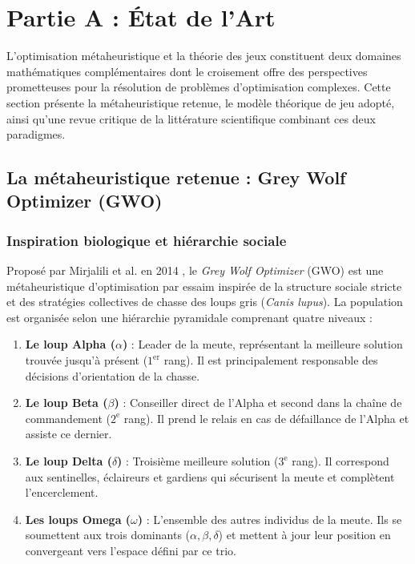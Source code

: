 \section{Partie A : État de l'Art}

L'optimisation métaheuristique et la théorie des jeux constituent deux domaines mathématiques complémentaires dont le croisement offre des perspectives prometteuses pour la résolution de problèmes d'optimisation complexes. Cette section présente la métaheuristique retenue, le modèle théorique de jeu adopté, ainsi qu'une revue critique de la littérature scientifique combinant ces deux paradigmes.

\subsection{La métaheuristique retenue : Grey Wolf Optimizer (GWO)}

\subsubsection{Inspiration biologique et hiérarchie sociale}
Proposé par Mirjalili et al. en 2014 \cite{mirjalili2014grey}, le \textit{Grey Wolf Optimizer} (GWO) est une métaheuristique d'optimisation par essaim inspirée de la structure sociale stricte et des stratégies collectives de chasse des loups gris (\textit{Canis lupus}). La population est organisée selon une hiérarchie pyramidale comprenant quatre niveaux :
\begin{enumerate}
    \item \textbf{Le loup Alpha ($\alpha$)} : Leader de la meute, représentant la meilleure solution trouvée jusqu'à présent ($1^{\text{er}}$ rang). Il est principalement responsable des décisions d'orientation de la chasse.
    \item \textbf{Le loup Beta ($\beta$)} : Conseiller direct de l'Alpha et second dans la chaîne de commandement ($2^{\text{e}}$ rang). Il prend le relais en cas de défaillance de l'Alpha et assiste ce dernier.
    \item \textbf{Le loup Delta ($\delta$)} : Troisième meilleure solution ($3^{\text{e}}$ rang). Il correspond aux sentinelles, éclaireurs et gardiens qui sécurisent la meute et complètent l'encerclement.
    \item \textbf{Les loups Omega ($\omega$)} : L'ensemble des autres individus de la meute. Ils se soumettent aux trois dominants ($\alpha, \beta, \delta$) et mettent à jour leur position en convergeant vers l'espace défini par ce trio.
\end{enumerate}

